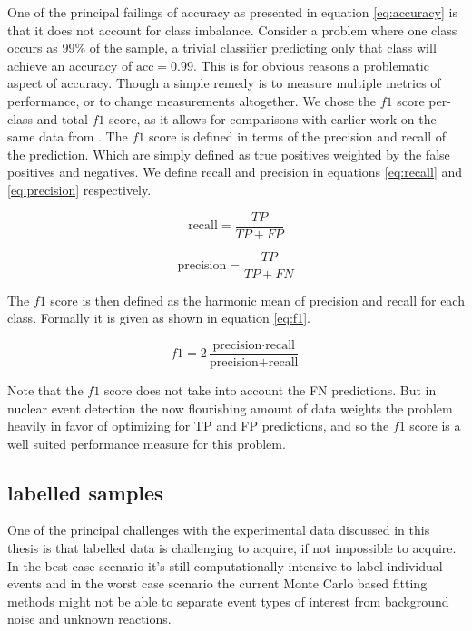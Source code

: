 \noindent One of the principal failings of accuracy as presented in equation \ref{eq:accuracy} is that it does not account for class imbalance. Consider a problem where one class occurs as $99\%$ of the sample, a trivial classifier predicting only that class will achieve an accuracy of $\text{acc}=0.99$. This is for obvious reasons a problematic aspect of accuracy. Though a simple remedy is to measure multiple metrics of performance, or to change measurements altogether. We chose the $f1$ score per-class and total $f1$ score, as it allows for comparisons with earlier work on the same data from \citet{Kuchera2019}. The $f1$ score is defined in terms of the precision and recall of the prediction. Which are simply defined as true positives weighted by the false positives and negatives. We define recall and precision in equations \ref{eq:recall} and \ref{eq:precision} respectively.

\begin{equation}\label{eq:recall}
\text{recall}= \frac{TP}{TP + FP}
\end{equation}

\begin{equation}\label{eq:precision}
\text{precision} = \frac{TP}{TP + FN}
\end{equation}

\noindent The $f1$ score is then defined as the harmonic mean of precision and recall for each class. Formally it is given as shown in equation \ref{eq:f1}.

\begin{equation}\label{eq:f1}
f1 = 2 \frac{\text{precision} \cdot \text{recall}}{\text{precision} + \text{recall}}
\end{equation}

\noindent Note that the $f1$ score does not take into account the FN predictions. But in nuclear event detection the now flourishing amount of data weights the problem heavily in favor of optimizing for TP and FP predictions, and so the $f1$ score is a well suited performance measure for this problem. 

\subsection{labelled samples}

One of the principal challenges with the experimental data discussed in this thesis is that labelled data is challenging to acquire, if not impossible to acquire. In the best case scenario it's still computationally intensive to label individual events and in the worst case scenario the current Monte Carlo based fitting methods might not be able to separate event types of interest from background noise and unknown reactions.

